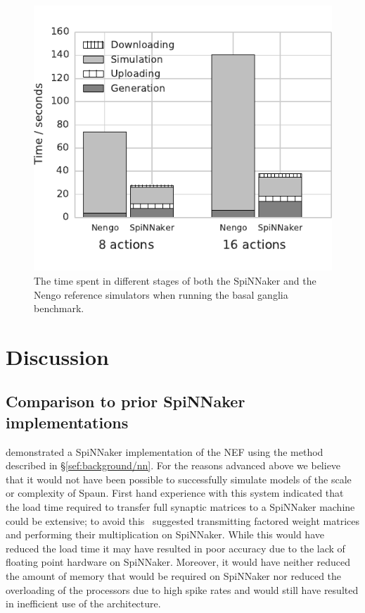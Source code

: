 \documentclass[conference]{IEEEtran}
\begin{document}
  \begin{figure}[!t]
    \includegraphics{figures/spa_wall_clock}
    \caption{The time spent in different stages of both the SpiNNaker and the Nengo reference simulators when running the basal ganglia benchmark. }
    \label{fig:results/spa-wall-clock}
  \end{figure}
  \section{Discussion}

  \subsection{Comparison to prior SpiNNaker implementations}

  \textcite{Galluppi2012} demonstrated a SpiNNaker implementation of the NEF using the method described in \S\ref{sef:background/nn}.
  For the reasons advanced above we believe that it would not have been possible to successfully simulate models of the scale or complexity of Spaun.
  First hand experience with this system indicated that the load time required to transfer full synaptic matrices to a SpiNNaker machine could be extensive; to avoid this \citeauthor*{Galluppi2012}\ suggested transmitting factored weight matrices and performing their multiplication on SpiNNaker.
  While this would have reduced the load time it may have resulted in poor accuracy due to the lack of floating point hardware on SpiNNaker.
  Moreover, it would have neither reduced the amount of memory that would be required on SpiNNaker nor reduced the overloading of the processors due to high spike rates and would still have resulted in inefficient use of the architecture.
\end{document}
